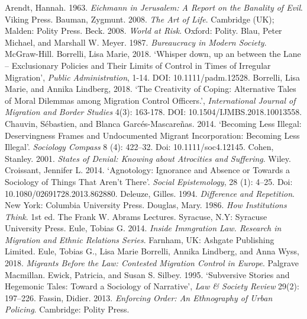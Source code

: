 \label{paper4:references}
\begin{thebibliography}{99}

 Arendt, Hannah. 1963. \textit{Eichmann in Jerusalem: A Report on the Banality of Evil}. Viking Press.
 Bauman, Zygmunt. 2008. \textit{The Art of Life}. Cambridge (UK); Malden: Polity Press.
 Beck. 2008. \textit{World at Risk}. Oxford: Polity.
 Blau, Peter Michael, and Marshall W. Meyer. 1987. \textit{Bureaucracy in Modern Society}. McGraw-Hill.
 Borrelli, Lisa Marie, 2018. ‘Whisper down, up an between the Lane – Exclusionary Policies and Their Limits of Control in Times of Irregular Migration’, \textit{Public Administration}, 1-14. DOI: 10.1111/padm.12528.
 Borrelli, Lisa Marie, and Annika Lindberg, 2018. ‘The Creativity of Coping: Alternative Tales of Moral Dilemmas among Migration Control Officers.’, \textit{International Journal of Migration and Border Studies} 4(3): 163-178. DOI: 10.1504/IJMBS.2018.10013558.
 Chauvin, Sébastien, and Blanca Garcés-Mascareñas. 2014. ‘Becoming Less Illegal: Deservingness Frames and Undocumented Migrant Incorporation: Becoming Less Illegal’. \textit{Sociology Compass} 8 (4): 422–32. Doi: 10.1111/soc4.12145.
 Cohen, Stanley. 2001. \textit{States of Denial: Knowing about Atrocities and Suffering}. Wiley.
 Croissant, Jennifer L. 2014. ‘Agnotology: Ignorance and Absence or Towards a Sociology of Things That Aren’t There’. \textit{Social Epistemology}, 28 (1): 4–25. Doi: 10.1080/02691728.2013.862880.
 Deleuze, Gilles. 1994. \textit{Difference and Repetition}. New York: Columbia University Press.
 Douglas, Mary. 1986. \textit{How Institutions Think}. 1st ed. The Frank W. Abrams Lectures. Syracuse, N.Y: Syracuse University Press.
 Eule, Tobias G. 2014. \textit{Inside Immgration Law. Research in Migration and Ethnic Relations Series}. Farnham, UK: Ashgate Publishing Limited.
 Eule, Tobias G., Lisa Marie Borrelli, Annika Lindberg, and Anna Wyss, 2018. \textit{Migrants Before the Law: Contested Migration Control in Europe}. Palgrave Macmillan.
 Ewick, Patricia, and Susan S. Silbey. 1995. ‘Subversive Stories and Hegemonic Tales: Toward a Sociology of Narrative’, \textit{Law \& Society Review} 29(2): 197–226.
 Fassin, Didier. 2013. \textit{Enforcing Order: An Ethnography of Urban Policing}. Cambridge: Polity Press.

\end{thebibliography}
